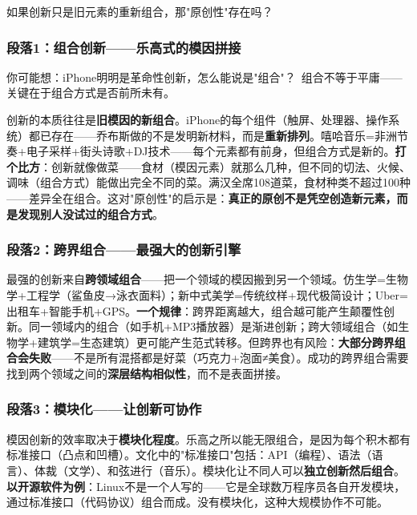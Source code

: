 \documentclass[../main.tex]{subfiles}
\begin{document}
\begin{questionbox}

	如果创新只是旧元素的重新组合，那"原创性"存在吗？

\end{questionbox}

\subsubsection*{段落1：组合创新——乐高式的模因拼接}

\begin{tcolorbox}[colback=yellow!5, title=\textit{读者行为预测}]

	你可能想：iPhone明明是革命性创新，怎么能说是"组合"？\ 组合不等于平庸——关键在于组合方式是否前所未有。

\end{tcolorbox}

创新的本质往往是\textbf{旧模因的新组合}。iPhone的每个组件（触屏、处理器、操作系统）都已存在——乔布斯做的不是发明新材料，而是\textbf{重新排列}。嘻哈音乐=非洲节奏+电子采样+街头诗歌+DJ技术——每个元素都有前身，但组合方式是新的。\textbf{打个比方}：创新就像做菜——食材（模因元素）就那么几种，但不同的切法、火候、调味（组合方式）能做出完全不同的菜。满汉全席108道菜，食材种类不超过100种——差异全在组合。这对"原创性"的启示是：\textbf{真正的原创不是凭空创造新元素，而是发现别人没试过的组合方式}。

\subsubsection*{段落2：跨界组合——最强大的创新引擎}

最强的创新来自\textbf{跨领域组合}——把一个领域的模因搬到另一个领域。仿生学=生物学+工程学（鲨鱼皮→泳衣面料）；新中式美学=传统纹样+现代极简设计；Uber=出租车+智能手机+GPS。\textbf{一个规律}：跨界距离越大，组合越可能产生颠覆性创新。同一领域内的组合（如手机+MP3播放器）是渐进创新；跨大领域组合（如生物学+建筑学=生态建筑）更可能产生范式转移。但跨界也有风险：\textbf{大部分跨界组合会失败}——不是所有混搭都是好菜（巧克力+泡面≠美食）。成功的跨界组合需要找到两个领域之间的\textbf{深层结构相似性}，而不是表面拼接。

\subsubsection*{段落3：模块化——让创新可协作}

模因创新的效率取决于\textbf{模块化程度}。乐高之所以能无限组合，是因为每个积木都有标准接口（凸点和凹槽）。文化中的"标准接口"包括：API（编程）、语法（语言）、体裁（文学）、和弦进行（音乐）。模块化让不同人可以\textbf{独立创新然后组合}。\textbf{以开源软件为例}：Linux不是一个人写的——它是全球数万程序员各自开发模块，通过标准接口（代码协议）组合而成。没有模块化，这种大规模协作不可能。
\end{document}
